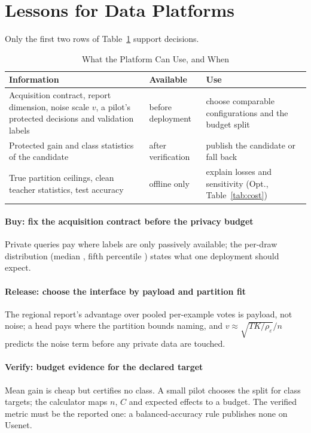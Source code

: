 \section{Lessons for Data Platforms}
\label{sec:discussion}

Only the first two rows of Table~\ref{tab:information} support decisions.

\begin{table}[t]
\caption{What the Platform Can Use, and When}
\label{tab:information}\small\setlength{\tabcolsep}{3pt}
\centering
\begin{tabular}{@{}>{\raggedright\arraybackslash}p{}>{\raggedright\arraybackslash}p{}>{\raggedright\arraybackslash}p{}@{}}\toprule
Information & Available & Use \\\midrule
Acquisition contract, report dimension, noise scale $v$, a pilot's
protected decisions and validation labels & before deployment & choose comparable
configurations and the budget split \\
Protected gain and class statistics of the candidate & after
verification & publish the candidate or fall back \\
True partition ceilings, clean teacher statistics, test accuracy & offline
only & explain losses and sensitivity (Opt., Table~\ref{tab:cost}) \\
\bottomrule\end{tabular}
\end{table}

\paragraph{Buy: fix the acquisition contract before the privacy budget}
Private queries pay where labels are only passively available; the per-draw
distribution (median \GainMedian{}, fifth percentile \GainFifth{}) states
what one deployment should expect.

\paragraph{Release: choose the interface by payload and partition fit}
The regional report's advantage over pooled per-example votes is payload,
not noise; a head pays where the partition bounds naming, and $v\approx\sqrt{TK/\rho_\varepsilon}/n$ predicts the noise term before any
private data are touched.

\paragraph{Verify: budget evidence for the declared target}
Mean gain is cheap but certifies no class. A small pilot chooses the split
for class targets; the calculator maps $n$, $C$ and expected effects
to a budget. The verified metric must be the reported one: a balanced-accuracy rule publishes none on Usenet.

